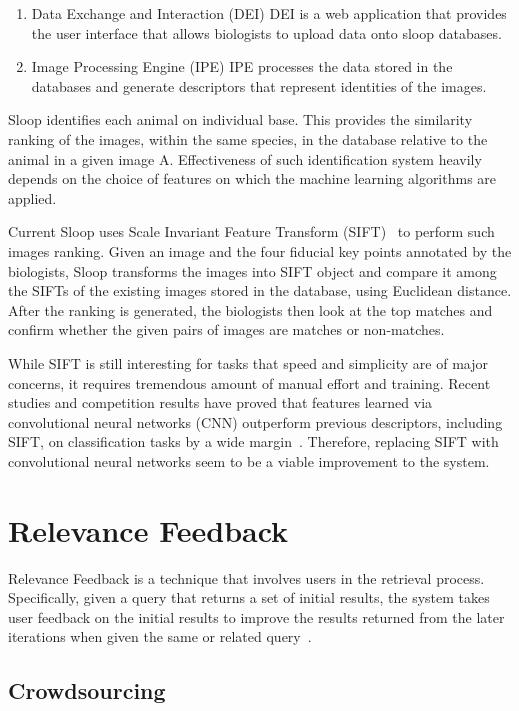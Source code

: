 \begin{enumerate}
	\item Data Exchange and Interaction (DEI)
    DEI is a web application that provides the user interface that allows
    biologists to upload data onto sloop databases.
	\item Image Processing Engine (IPE)
    IPE processes the data stored in the databases and generate descriptors
    that represent identities of the images.
\end{enumerate}


Sloop identifies each animal on individual base. This provides the similarity
ranking of the images, within the same species, in the database relative to the
animal in a given image A. Effectiveness of such identification system heavily
depends on the choice of features on which the machine learning algorithms are
applied.

Current Sloop uses Scale Invariant Feature Transform (SIFT)~\cite{lowe04} to
perform such images ranking. Given an image and the four fiducial key points
annotated by the biologists, Sloop transforms the images into SIFT object and
compare it among the SIFTs of the existing images stored in the database, using
Euclidean distance. After the ranking is generated, the biologists then look at
the top matches and confirm whether the given pairs of images are matches or
non-matches.

While SIFT is still interesting for tasks that speed and simplicity are of
major concerns, it requires tremendous amount of manual effort and training.
Recent studies and competition results have proved that features learned via
convolutional neural networks (CNN) outperform previous descriptors, including
SIFT, on classification tasks by a wide margin~\cite{fisher14}. Therefore,
replacing SIFT with convolutional neural networks seem to be a viable
improvement to the system.

\section{Relevance Feedback}

Relevance Feedback is a technique that involves users in the retrieval process.
Specifically, given a query that returns a set of initial results, the system
takes user feedback on the initial results to improve the results returned from
the later iterations when given the same or related
query~\cite{manning2008introduction}.

\subsection{Crowdsourcing}


